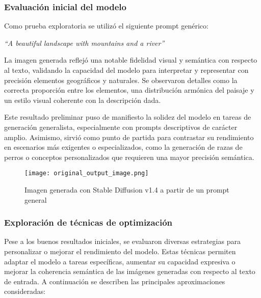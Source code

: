 \subsubsection{Evaluación inicial del modelo}

Como prueba exploratoria se utilizó el siguiente prompt genérico:

\begin{center}
\textit{``A beautiful landscape with mountains and a river''}
\end{center}

La imagen generada reflejó una notable fidelidad visual y semántica con respecto al texto, validando la capacidad del modelo para interpretar y representar con precisión elementos geográficos y naturales. Se observaron detalles como la correcta proporción entre los elementos, una distribución armónica del paisaje y un estilo visual coherente con la descripción dada.

Este resultado preliminar puso de manifiesto la solidez del modelo en tareas de generación generalista, especialmente con prompts descriptivos de carácter amplio. Asimismo, sirvió como punto de partida para contrastar su rendimiento en escenarios más exigentes o especializados, como la generación de razas de perros o conceptos personalizados que requieren una mayor precisión semántica.

\begin{figure}[H]
\centering
\texttt{[image: original\_output\_image.png]}
\caption{Imagen generada con Stable Diffusion v1.4 a partir de un prompt general}
\label{fig:original_image}
\end{figure}

\subsubsection{Exploración de técnicas de optimización}
Pese a los buenos resultados iniciales, se evaluaron diversas estrategias para personalizar o mejorar el rendimiento del modelo. Estas técnicas permiten adaptar el modelo a tareas específicas, aumentar su capacidad expresiva o mejorar la coherencia semántica de las imágenes generadas con respecto al texto de entrada. A continuación se describen las principales aproximaciones consideradas:

